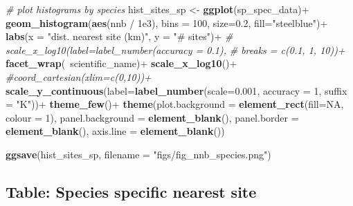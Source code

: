 \documentclass[]{article}
\newenvironment{Shaded}{}{}
\newcommand{\CommentTok}[1]{\textcolor[rgb]{0.38,0.63,0.69}{\textit{#1}}}
\newcommand{\DataTypeTok}[1]{\textcolor[rgb]{0.56,0.13,0.00}{#1}}
\newcommand{\DecValTok}[1]{\textcolor[rgb]{0.25,0.63,0.44}{#1}}
\newcommand{\FloatTok}[1]{\textcolor[rgb]{0.25,0.63,0.44}{#1}}
\newcommand{\KeywordTok}[1]{\textcolor[rgb]{0.00,0.44,0.13}{\textbf{#1}}}
\newcommand{\NormalTok}[1]{#1}
\newcommand{\OperatorTok}[1]{\textcolor[rgb]{0.40,0.40,0.40}{#1}}
\newcommand{\OtherTok}[1]{\textcolor[rgb]{0.00,0.44,0.13}{#1}}
\newcommand{\StringTok}[1]{\textcolor[rgb]{0.25,0.44,0.63}{#1}}
\begin{document}
\begin{Shaded}
\begin{Highlighting}[]
\CommentTok{# plot histograms by species}
\NormalTok{hist_sites_sp <-}\StringTok{ }
\StringTok{  }\KeywordTok{ggplot}\NormalTok{(sp_spec_data)}\OperatorTok{+}
\StringTok{  }\KeywordTok{geom_histogram}\NormalTok{(}\KeywordTok{aes}\NormalTok{(nnb }\OperatorTok{/}\StringTok{ }\FloatTok{1e3}\NormalTok{),}
                 \DataTypeTok{bins =} \DecValTok{100}\NormalTok{, }\DataTypeTok{size=}\FloatTok{0.2}\NormalTok{, }\DataTypeTok{fill=}\StringTok{"steelblue"}\NormalTok{)}\OperatorTok{+}
\StringTok{  }\KeywordTok{labs}\NormalTok{(}\DataTypeTok{x =} \StringTok{"dist. nearest site (km)"}\NormalTok{, }\DataTypeTok{y =} \StringTok{"# sites"}\NormalTok{)}\OperatorTok{+}
\StringTok{  }\CommentTok{# scale_x_log10(label=label_number(accuracy = 0.1), }
\StringTok{  }\CommentTok{#               breaks = c(0.1, 1, 10))+}
\StringTok{  }\KeywordTok{facet_wrap}\NormalTok{(}\OperatorTok{~}\NormalTok{scientific_name)}\OperatorTok{+}
\StringTok{  }\KeywordTok{scale_x_log10}\NormalTok{()}\OperatorTok{+}
\StringTok{  }\CommentTok{#coord_cartesian(xlim=c(0,10))+}
\StringTok{  }\KeywordTok{scale_y_continuous}\NormalTok{(}\DataTypeTok{label=}\KeywordTok{label_number}\NormalTok{(}\DataTypeTok{scale=}\FloatTok{0.001}\NormalTok{, }\DataTypeTok{accuracy =} \DecValTok{1}\NormalTok{, }
                                        \DataTypeTok{suffix =} \StringTok{"K"}\NormalTok{))}\OperatorTok{+}
\StringTok{  }\KeywordTok{theme_few}\NormalTok{()}\OperatorTok{+}
\StringTok{  }\KeywordTok{theme}\NormalTok{(}\DataTypeTok{plot.background =} \KeywordTok{element_rect}\NormalTok{(}\DataTypeTok{fill=}\OtherTok{NA}\NormalTok{, }\DataTypeTok{colour =} \DecValTok{1}\NormalTok{),}
        \DataTypeTok{panel.background =} \KeywordTok{element_blank}\NormalTok{(),}
        \DataTypeTok{panel.border =} \KeywordTok{element_blank}\NormalTok{(), }\DataTypeTok{axis.line =} \KeywordTok{element_blank}\NormalTok{())}

\KeywordTok{ggsave}\NormalTok{(hist_sites_sp, }\DataTypeTok{filename =} \StringTok{"figs/fig_nnb_species.png"}\NormalTok{)}
\end{Highlighting}
\end{Shaded}

\hypertarget{table-species-specific-nearest-site}{%
\subsection{Table: Species specific nearest site}\label{table-species-specific-nearest-site}}
\end{document}
